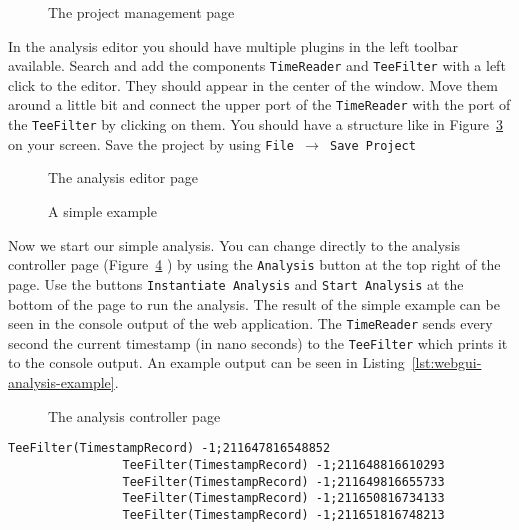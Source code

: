 			\begin{figure}[h!]
				\caption{The project management page}
				\label{fig:webgui-project-management-page}
			\end{figure}

			\noindent
			In the analysis editor you should have multiple plugins in the left toolbar available. Search and add the components \texttt{TimeReader} and \texttt{TeeFilter} with a left click to the editor. They should appear in the center of the window. Move them around a little bit and connect the upper port of the \texttt{TimeReader} with the port of the \texttt{TeeFilter} by clicking on them. You should have a structure like in Figure~\ref{fig:webgui-analysis-example} on your screen. Save the project by using \texttt{File $\to$ Save Project}
		
			\begin{figure}[h!]
				\caption{The analysis editor page}
				\label{fig:webgui-analysis-editor-page}
			\end{figure}
			
			\begin{figure}[h!]
				\caption{A simple example}
				\label{fig:webgui-analysis-example}
			\end{figure}
			
			\noindent
			Now we start our simple analysis. You can change directly to the analysis controller page (Figure~\ref{fig:webgui-analysis-controller-page} ) by using the \texttt{Analysis} button at the top right of the page. Use the buttons \texttt{Instantiate Analysis} and \texttt{Start Analysis} at the bottom of the page to run the analysis. The result of the simple example can be seen in the console output of the web application. The \texttt{TimeReader} sends every second the current timestamp (in nano seconds) to the \texttt{TeeFilter} which prints it to the console output. An example output can be seen in Listing~\ref{lst:webgui-analysis-example}.
			
			
			\begin{figure}[h!]
				\caption{The analysis controller page}
				\label{fig:webgui-analysis-controller-page}
			\end{figure}
			
			\setTextListing
			\begin{lstlisting}[gobble = 8, label=lst:webgui-analysis-example, caption=Execution of the example analysis]
				TeeFilter(TimestampRecord) -1;211647816548852
				TeeFilter(TimestampRecord) -1;211648816610293
				TeeFilter(TimestampRecord) -1;211649816655733
				TeeFilter(TimestampRecord) -1;211650816734133
				TeeFilter(TimestampRecord) -1;211651816748213
			\end{lstlisting}
			
